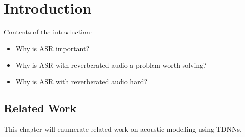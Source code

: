 
\chapter{Introduction}
\label{ch:Introduction}

Contents of the introduction: 
\begin{itemize}
\item Why is ASR important? 
\item Why is ASR with reverberated audio a problem worth solving?
\item Why is ASR with reverberated audio hard? 
\end{itemize}

\section{Related Work}
\label{ch:related_work}
This chapter will enumerate related work on acoustic modelling using TDNNs. 